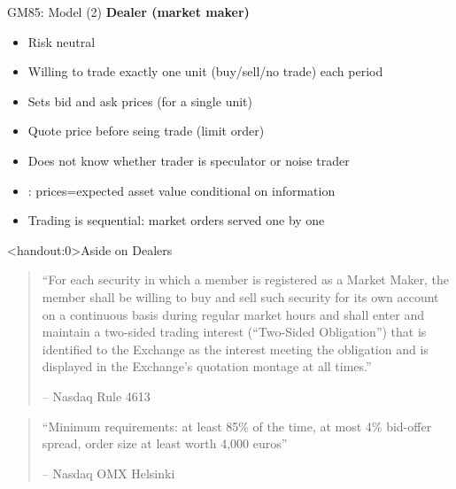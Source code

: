 \documentclass[english,10pt
,aspectratio=169
]{beamer}
\begin{document}
\begin{frame}{GM85: Model (2)}
	\textbf{Dealer (market maker)}
	\begin{itemize}
		\item Risk neutral
		\item Willing to trade \alert{exactly one unit} (buy/sell/no trade) each period
		\item Sets \alert{bid and ask prices} (for a single unit)
		\item Quote price before seing trade (limit order)
		\item Does not know whether trader is speculator or noise trader
		\item {}: prices=expected asset value conditional on information
		\item Trading is sequential: market orders served one by one
	\end{itemize}
\end{frame}


\begin{frame}<handout:0>{Aside on Dealers}
	\begin{quotation}
		\small ``For each security in which a member is registered as a Market Maker, the member shall be willing to buy and sell such security for its own account on a continuous basis during regular market hours and shall enter and maintain a two-sided trading interest (``Two-Sided Obligation'') that is identified to the Exchange as the interest meeting the obligation and is displayed in the Exchange's quotation montage at all times.''
		\begin{flushright}
			-- Nasdaq Rule 4613
		\end{flushright}
	\end{quotation}
	\vspace{3ex}
	\begin{quotation}
		\small ``Minimum requirements: at least 85\% of the time, at most 4\% bid-offer
		spread, order size at least worth 4,000 euros''
		\begin{flushright}
			-- Nasdaq OMX Helsinki
		\end{flushright}
	\end{quotation}
\end{frame}
\end{document}
